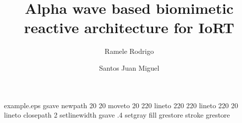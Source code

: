%
%
%
%
%
\begin{filecontents*}{example.eps}
gsave
newpath
  20 20 moveto
  20 220 lineto
  220 220 lineto
  220 20 lineto
closepath
2 setlinewidth
gsave
  .4 setgray fill
grestore
stroke
grestore
\end{filecontents*}
%
\RequirePackage{fix-cm}
%
\documentclass[smallextended]{svjour3}       %
%
\smartqed  %
%
\usepackage{graphicx}
%
%
%
%
%


\title{Alpha wave based biomimetic reactive architecture for IoRT%
}


\author{Ramele Rodrigo        \and
        Santos Juan Miguel %
}




